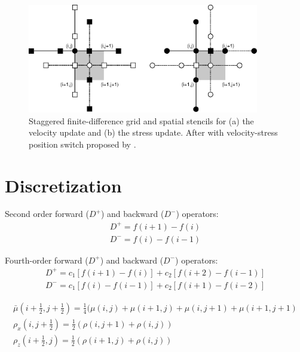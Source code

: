 \documentclass{gnulike}
\begin{document}
\begin{figure}[!ht]
  \centering
  \includegraphics[width=0.9\textwidth]{fig/staggered.eps}
  \caption{Staggered finite-difference grid and spatial stencils for (a) the velocity update and (b) the stress update. After \cite{levander1988fourth} with velocity-stress position switch proposed by \cite{bohlen2006accuracy}.}
  \label{fig:staggered-grid}
\end{figure}

\section{Discretization}

\noindent Second order forward ($D^{+}$) and backward ($D^{-}$) operators:
\begin{eqnarray}
  D^{+}=f(i+1)-f(i) \nonumber \\
  D^{-}=f(i)-f(i-1)
\end{eqnarray}

\noindent Fourth-order forward ($D^{+}$) and backward ($D^{-}$) operators:
\begin{eqnarray}
  D^{+}=c_{1}[f(i+1)-f(i)]+c_{2}[f(i+2)-f(i-1)] \nonumber \\
  D^{-}=c_{1}[f(i)-f(i-1)]+c_{2}[f(i+1)-f(i-2)]
\end{eqnarray}


\begin{eqnarray}
  \bar{\mu}(i+\frac{1}{2}, j+\frac{1}{2})=\frac{1}{4}(\mu(i,j)+\mu(i+1,j)+\mu(i,j+1)+\mu(i+1,j+1) \\
  \rho_{x}(i,j+\frac{1}{2}) = \frac{1}{2}(\rho (i,j+1)+\rho(i,j)) \\
  \rho_{z}(i+\frac{1}{2},j) = \frac{1}{2}(\rho (i+1,j)+\rho(i,j))
\end{eqnarray}
\end{document}
